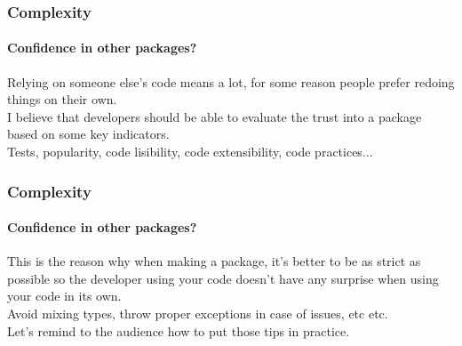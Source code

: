 \begin{frame}
    \frametitle{Complexity}
    \framesubtitle{Confidence in other packages?}

    Relying on someone else's code means a lot, for some reason people prefer
    redoing things on their own.\\
    \pause
    I believe that developers should be able to evaluate the trust into a
    package based on some key indicators.\\
    \pause
    Tests, popularity, code lisibility, code extensibility, code practices...
\end{frame}

\begin{frame}
    \frametitle{Complexity}
    \framesubtitle{Confidence in other packages?}

    This is the reason why when making a package, it's better to be as strict
    as possible so the developer using your code doesn't have any surprise when
    using your code in its own.\\
    \pause
    Avoid mixing types, throw proper exceptions in case of issues, etc etc.\\
    \pause
    Let's remind to the audience how to put those tips in practice.
\end{frame}
